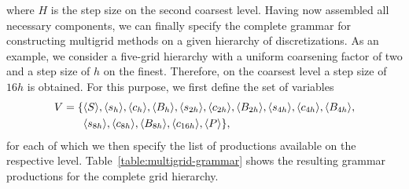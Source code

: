 where $H$ is the step size on the second coarsest level.
Having now assembled all necessary components, we can finally specify the complete grammar for constructing multigrid methods on a given hierarchy of discretizations.
As an example, we consider a five-grid hierarchy with a uniform coarsening factor of two and a step size of $h$ on the finest.
Therefore, on the coarsest level a step size of $16h$ is obtained.
For this purpose, we first define the set of variables 
\begin{align}
	V = \{ & \langle S \rangle, \langle s_h \rangle, \langle c_h \rangle, \langle B_h \rangle, \langle s_{2h} \rangle, \langle c_{2h} \rangle, \langle B_{2h} \rangle, \langle s_{4h} \rangle, \langle c_{4h} \rangle, \langle B_{4h} \rangle, \\
	& \langle s_{8h} \rangle, \langle c_{8h} \rangle, \langle B_{8h} \rangle, \langle c_{16h} \rangle, \langle P \rangle \},
	\label{eq:multigrid-grammar-variables}
\end{align}
for each of which we then specify the list of productions available on the respective level. 
Table~\ref{table:multigrid-grammar} shows the resulting grammar productions for the complete grid hierarchy.
